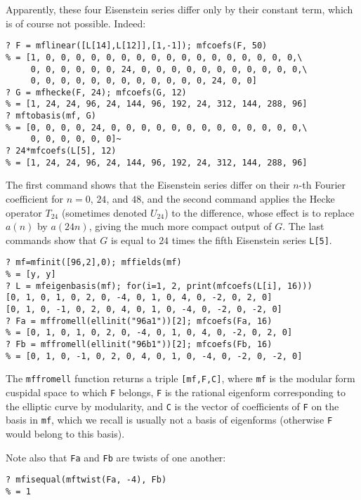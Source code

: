 \documentclass[11pt]{article}
\def\kbd#1{{\tt #1}}
\begin{document}
Apparently, these four Eisenstein series differ only by their constant
term, which is of course not possible. Indeed:

\begin{verbatim}
? F = mflinear([L[14],L[12]],[1,-1]); mfcoefs(F, 50)
% = [1, 0, 0, 0, 0, 0, 0, 0, 0, 0, 0, 0, 0, 0, 0, 0, 0, 0,\
     0, 0, 0, 0, 0, 0, 24, 0, 0, 0, 0, 0, 0, 0, 0, 0, 0, 0,\
     0, 0, 0, 0, 0, 0, 0, 0, 0, 0, 0, 0, 24, 0, 0]
? G = mfhecke(F, 24); mfcoefs(G, 12)
% = [1, 24, 24, 96, 24, 144, 96, 192, 24, 312, 144, 288, 96]
? mftobasis(mf, G)
% = [0, 0, 0, 0, 24, 0, 0, 0, 0, 0, 0, 0, 0, 0, 0, 0, 0, 0,\
     0, 0, 0, 0, 0, 0]~
? 24*mfcoefs(L[5], 12)
% = [1, 24, 24, 96, 24, 144, 96, 192, 24, 312, 144, 288, 96]
\end{verbatim}

The first command shows that the Eisenstein series differ on their $n$-th
Fourier coefficient for $n=0$, $24$, and $48$, and the second command applies
the Hecke operator $T_{24}$ (sometimes denoted $U_{24}$) to the difference,
whose effect is to replace $a(n)$ by $a(24n)$, giving the much more
compact output of $G$. The last commands show that $G$ is equal to
$24$ times the fifth Eisenstein series \kbd{L[5]}.

\begin{verbatim}
? mf=mfinit([96,2],0); mffields(mf)
% = [y, y]
? L = mfeigenbasis(mf); for(i=1, 2, print(mfcoefs(L[i], 16)))
[0, 1, 0, 1, 0, 2, 0, -4, 0, 1, 0, 4, 0, -2, 0, 2, 0]
[0, 1, 0, -1, 0, 2, 0, 4, 0, 1, 0, -4, 0, -2, 0, -2, 0]
? Fa = mffromell(ellinit("96a1"))[2]; mfcoefs(Fa, 16)
% = [0, 1, 0, 1, 0, 2, 0, -4, 0, 1, 0, 4, 0, -2, 0, 2, 0]
? Fb = mffromell(ellinit("96b1"))[2]; mfcoefs(Fb, 16)
% = [0, 1, 0, -1, 0, 2, 0, 4, 0, 1, 0, -4, 0, -2, 0, -2, 0]
\end{verbatim}

The \kbd{mffromell} function returns a triple \kbd{[mf,F,C]},
where \kbd{mf} is the modular form cuspidal space to which \kbd{F} belongs,
\kbd{F} is the rational eigenform corresponding to the elliptic curve by
modularity, and \kbd{C} is the vector of coefficients of \kbd{F} on the
basis in \kbd{mf}, which we recall is usually not a basis of eigenforms
(otherwise \kbd{F} would belong to this basis).

Note also that \kbd{Fa} and \kbd{Fb} are twists of one another:

\begin{verbatim}
? mfisequal(mftwist(Fa, -4), Fb)
% = 1
\end{verbatim}
\end{document}
